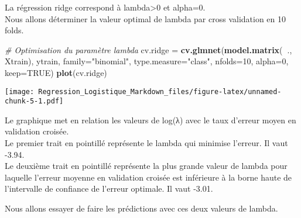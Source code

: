 \documentclass[
]{article}
\newenvironment{Shaded}{\begin{snugshade}}{\end{snugshade}}
\newcommand{\CommentTok}[1]{\textcolor[rgb]{0.56,0.35,0.01}{\textit{#1}}}
\newcommand{\DataTypeTok}[1]{\textcolor[rgb]{0.13,0.29,0.53}{#1}}
\newcommand{\DecValTok}[1]{\textcolor[rgb]{0.00,0.00,0.81}{#1}}
\newcommand{\FloatTok}[1]{\textcolor[rgb]{0.00,0.00,0.81}{#1}}
\newcommand{\KeywordTok}[1]{\textcolor[rgb]{0.13,0.29,0.53}{\textbf{#1}}}
\newcommand{\NormalTok}[1]{#1}
\newcommand{\OperatorTok}[1]{\textcolor[rgb]{0.81,0.36,0.00}{\textbf{#1}}}
\newcommand{\OtherTok}[1]{\textcolor[rgb]{0.56,0.35,0.01}{#1}}
\newcommand{\StringTok}[1]{\textcolor[rgb]{0.31,0.60,0.02}{#1}}
\begin{document}
La régression ridge correspond à lambda\textgreater0 et alpha=0.\\
Nous allons déterminer la valeur optimal de lambda par cross validation
en 10 folds.

\begin{Shaded}
\begin{Highlighting}[]
\CommentTok{# Optimisation du paramètre lambda}
\NormalTok{cv.ridge =}\StringTok{ }\KeywordTok{cv.glmnet}\NormalTok{(}\KeywordTok{model.matrix}\NormalTok{(}\OperatorTok{~}\NormalTok{., Xtrain), ytrain, }\DataTypeTok{family=}\StringTok{"binomial"}\NormalTok{, }\DataTypeTok{type.measure=}\StringTok{"class"}\NormalTok{, }\DataTypeTok{nfolds=}\DecValTok{10}\NormalTok{, }\DataTypeTok{alpha=}\DecValTok{0}\NormalTok{, }\DataTypeTok{keep=}\OtherTok{TRUE}\NormalTok{)}
\KeywordTok{plot}\NormalTok{(cv.ridge)}
\end{Highlighting}
\end{Shaded}

\texttt{[image: Regression\_Logistique\_Markdown\_files/figure-latex/unnamed-chunk-5-1.pdf]}

Le graphique met en relation les valeurs de log(λ) avec le taux d'erreur
moyen en validation croisée.\\
Le premier trait en pointillé représente le lambda qui minimise
l'erreur. Il vaut -3.94.\\
Le deuxième trait en pointillé représente la plus grande valeur de
lambda pour laquelle l'erreur moyenne en validation croisée est
inférieure à la borne haute de l'intervalle de confiance de l'erreur
optimale. Il vaut -3.01.

\begin{Shaded}
\end{Shaded}

Nous allons essayer de faire les prédictions avec ces deux valeurs de
lambda.
\end{document}
